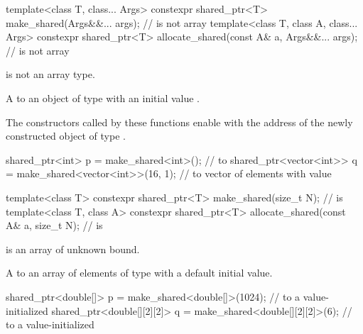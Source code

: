 %
%
\begin{itemdecl}
template<class T, class... Args>
  constexpr shared_ptr<T> make_shared(Args&&... args);                    //  is not array
template<class T, class A, class... Args>
  constexpr shared_ptr<T> allocate_shared(const A& a, Args&&... args);    //  is not array
\end{itemdecl}

\begin{itemdescr}
\pnum
\constraints
{} is not an array type.

\pnum
\returns
A  to an object of type 
with an initial value .

\pnum
\remarks
The  constructors called by these functions
enable 
with the address of the newly constructed object of type .

\pnum
\begin{example}
\begin{codeblock}
shared_ptr<int> p = make_shared<int>(); //  to 
shared_ptr<vector<int>> q = make_shared<vector<int>>(16, 1);
  //  to vector of  elements with value 
\end{codeblock}
\end{example}
\end{itemdescr}

%
%
\begin{itemdecl}
template<class T>
  constexpr shared_ptr<T> make_shared(size_t N);                          //  is 
template<class T, class A>
  constexpr shared_ptr<T> allocate_shared(const A& a, size_t N);          //  is 
\end{itemdecl}

\begin{itemdescr}
\pnum
\constraints
{} is an array of unknown bound.

\pnum
\returns
A  to an array of
 elements of type 
with a default initial value.

\pnum
\begin{example}
\begin{codeblock}
shared_ptr<double[]> p = make_shared<double[]>(1024);
  //  to a value-initialized 
shared_ptr<double[][2][2]> q = make_shared<double[][2][2]>(6);
  //  to a value-initialized 
\end{codeblock}
\end{example}
\end{itemdescr}

